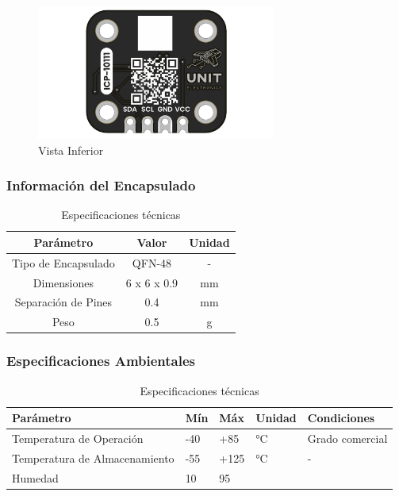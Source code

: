 \documentclass[11pt,a4paper]{article}
\begin{document}
\begin{figure}[H]
\centering
\includegraphics[width=0.7\textwidth]{es_unit_btm_v_1_0_0_icp10111_barometric_pressure_sensor.png}
\caption{Vista Inferior}
\label{fig:es-unit-btm-v-1-0-0-icp10111-barometric-pressure-sensor-png}
\end{figure}



\subsubsection{Información del Encapsulado}


\begin{table}[H]
\centering
\small
\begin{tabular}{|c|c|c|}
\hline
Parámetro & Valor & Unidad \\
\hline
Tipo de Encapsulado & QFN-48 & - \\
Dimensiones & 6 x 6 x 0.9 & mm \\
Separación de Pines & 0.4 & mm \\
Peso & 0.5 & g \\
\hline
\end{tabular}
\caption{Especificaciones técnicas}
\end{table}


\subsubsection{Especificaciones Ambientales}


\begin{table}[H]
\centering
\small
\begin{tabular}{|l|l|l|l|l|}
\hline
Parámetro & Mín & Máx & Unidad & Condiciones \\
\hline
Temperatura de Operación & -40 & +85 & °C & Grado comercial \\
Temperatura de Almacenamiento & -55 & +125 & °C & - \\
Humedad & 10 & 95 & %
\hline
\end{tabular}
\caption{Especificaciones técnicas}
\end{table}
\end{document}
